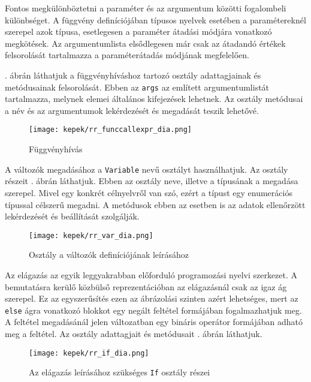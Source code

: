 Fontos megkülönböztetni a paraméter és az argumentum közötti fogalombeli különbséget. A függvény definíciójában típusos nyelvek esetében a paramétereknél szerepel azok típusa, esetlegesen a paraméter átadási módjára vonatkozó megkötések. Az argumentumlista elsődlegesen már csak az átadandó értékek felsorolását tartalmazza a paraméterátadás módjának megfelelően.

. ábrán láthatjuk a függvényhíváshoz tartozó osztály adattagjainak és metódusainak felsorolását. Ebben az \texttt{args} az említett argumentumlistát tartalmazza, melynek elemei általános kifejezések lehetnek. Az osztály metódusai a név és az argumentumok lekérdezését és megadását teszik lehetővé.

\begin{figure}[h!]
\centering
\texttt{[image: kepek/rr\_funccallexpr\_dia.png]}
\caption{Függvényhívás}
\label{fig:funccall}
\end{figure}


A változók megadásához a \texttt{Variable} nevű osztályt használhatjuk. Az osztály részeit . ábrán láthatjuk. Ebben az osztály neve, illetve a típusának a megadása szerepel. Mivel egy konkrét célnyelvről van szó, ezért a típust egy enumerációs típussal célszerű megadni. A metódusok ebben az esetben is az adatok ellenőrzött lekérdezését és beállítását szolgálják.

\begin{figure}[h!]
\centering
\texttt{[image: kepek/rr\_var\_dia.png]}
\caption{Osztály a változók definíciójának leírásához}
\label{fig:variable}
\end{figure}


Az elágazás az egyik leggyakrabban előforduló programozási nyelvi szerkezet. A bemutatásra kerülő közbülső reprezentációban az elágazásnál csak az igaz ág szerepel. Ez az egyszerűsítés ezen az ábrázolási szinten azért lehetséges, mert az \texttt{else} ágra vonatkozó blokkot egy negált feltétel formájában fogalmazhatjuk meg. A feltétel megadásánál jelen változatban egy bináris operátor formájában adható meg a feltétel. Az osztály adattagjait és metódusait . ábrán láthatjuk.

\begin{figure}[h!]
\centering
\texttt{[image: kepek/rr\_if\_dia.png]}
\caption{Az elágazás leírásához szükséges \texttt{If} osztály részei}
\label{fig:if}
\end{figure}

